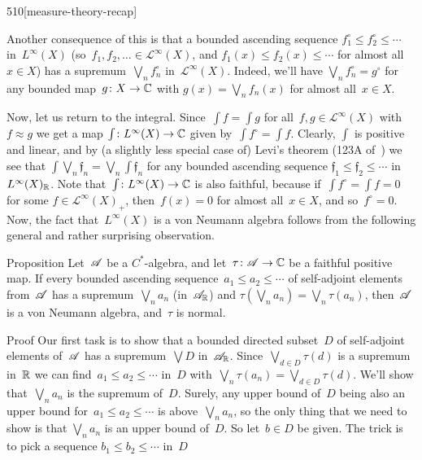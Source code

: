 \begin{parsec}{510}[measure-theory-recap]
\begin{point}{50}
Another consequence of this
is that a bounded ascending sequence
$f_1^\circ \leq f_2^\circ \leq \dotsb$
in~$L^\infty(X)$
(so~$f_1,f_2,\dotsc\in\mathcal{L}^\infty(X)$,
and $f_1(x)\leq f_2(x)\leq\dotsb$ for almost all~$x\in X$)
has a supremum~$\bigvee_n f_n^\circ$ in~$\mathcal{L}^\infty(X)$.
Indeed, we'll have
$\bigvee_n f_n^\circ = g^\circ$
for any bounded map~$g\colon X\to\mathbb{C}$
with $g(x)=\bigvee_n f_n(x)$
for almost all~$x\in X$.
\end{point}%
\begin{point}{60}%
Now, let us return to the integral.
Since~$\int f = \int g$
for all~$f,g\in \mathcal{L}^\infty(X)$
with $f\approx g$
we get a map
$\int \colon L^\infty(X)\to \mathbb{C}$
given
by~$\int  f^\circ = \int f$.
Clearly, $\int$ is positive and linear,
and by (a slightly less special case
of) Levi's theorem (123A of~\cite{fremlin})
we see that $\int \bigvee_n \mathfrak{f}_n
= \bigvee_n \int \mathfrak{f}_n$
for any bounded ascending sequence
$\mathfrak{f}_1\leq \mathfrak{f}_2\leq\dotsb$
in~$L^\infty(X)_{\mathbb{R}}$.
Note that~$\int\colon L^\infty(X)\to\mathbb{C}$
is also faithful,
because if~$\int f^\circ=\int f = 0$
for some $f\in \mathcal{L}^\infty(X)_+$,
then~$f(x)=0$ for almost all~$x\in X$,
and so~$f^\circ=0$.
Now,
the fact that~$L^\infty(X)$
is a von Neumann algebra follows from
the following general and rather surprising observation.
\end{point}
\begin{point}{70}{Proposition}%
Let~$\mathscr{A}$ be a $C^*$-algebra,
and let~$\tau\colon \mathscr{A}\to\mathbb{C}$
be a faithful positive map.
If every bounded ascending sequence~$a_1\leq a_2\leq \dotsb$
of self-adjoint elements from~$\mathscr{A}$ has a supremum~$\bigvee_n a_n$
(in~$\mathscr{A}_{\mathbb{R}}$)
and
$\tau(\bigvee_n a_n)=\bigvee_n \tau (a_n)$,
then~$\mathscr{A}$ is a von Neumann algebra,
and~$\tau$ is normal.
\begin{point}{80}{Proof}%
Our first task is to show that a bounded
directed subset~$D$ of self-adjoint elements of~$\mathscr{A}$
has a supremum~$\bigvee D$ in~$\mathscr{A}_{\mathbb{R}}$.
Since~$\bigvee_{d\in D} \tau(d)$
is a supremum in~$\mathbb{R}$
we can find~$a_1\leq a_2\leq \dotsb$ in~$D$
with~$\bigvee_n \tau(a_n) = \bigvee_{d\in D} \tau(d)$.
We'll show that~$\bigvee_n a_n$
is the supremum of~$D$.
Surely, any upper bound of~$D$ being also an upper bound 
for~$a_1\leq a_2\leq\dotsb$
is above~$\bigvee_n a_n$,
so the only thing that we need to show is that
$\bigvee_n a_n$ is an upper bound of~$D$.
So let~$b\in D$ be given.
The trick is to pick a sequence
$b_1\leq b_2\leq \dotsb$ in~$D$

\end{point}
\end{point}
\end{parsec}
